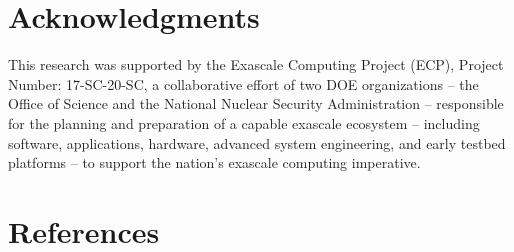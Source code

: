 \documentclass[review]{elsarticle}
\begin{document}

\section*{Acknowledgments}
This research was supported by the Exascale Computing Project (ECP), Project Number: 17-SC-20-SC, a collaborative effort of two DOE organizations -- the Office of Science and the National Nuclear Security Administration -- responsible for the planning and preparation of a capable exascale ecosystem -- including software, applications, hardware, advanced system engineering, and early testbed platforms -- to support the nation's exascale computing imperative.

\section*{References}


\end{document}
